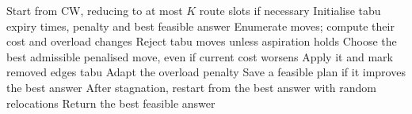 \begin{algorithm}[h]\caption{Tabu Search (\texttt{tabu.cpp}, moves in \texttt{routes.hpp})}
\begin{algorithmic}[1]
\State Start from CW, reducing to at most $K$ route slots if necessary
\State Initialise tabu expiry times, penalty and best feasible answer
 \State Enumerate moves; compute their cost and overload changes
 \State Reject tabu moves unless aspiration holds
 \State Choose the best admissible penalised move, even if current cost worsens
 \State Apply it and mark removed edges tabu
 \State Adapt the overload penalty
 \State Save a feasible plan if it improves the best answer
 \State After stagnation, restart from the best answer with random relocations
\EndWhile
\State Return the best feasible answer
\end{algorithmic}\end{algorithm}

